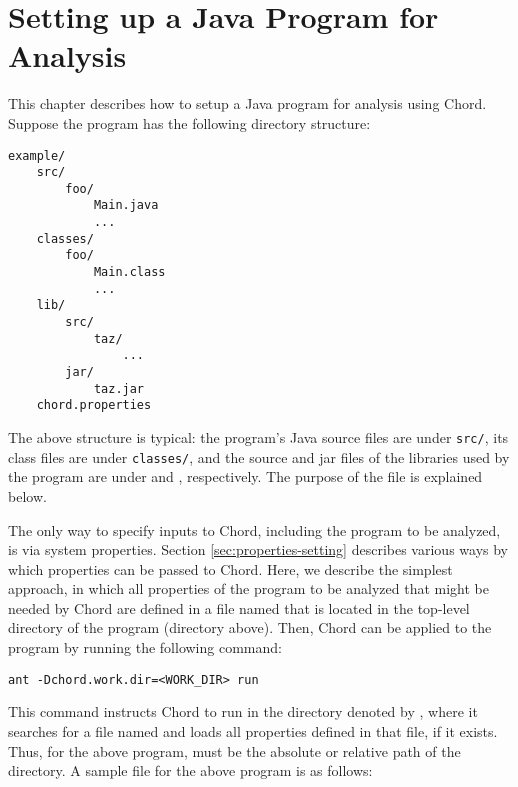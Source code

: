 \chapter{Setting up a Java Program for Analysis}
\label{chap:setup}

This chapter describes how to setup a Java program for analysis using Chord.
Suppose the program has the following directory structure:

\begin{framed}
\begin{verbatim}
example/
    src/
        foo/
            Main.java
            ...
    classes/
        foo/
            Main.class
            ...
    lib/
        src/
            taz/
                ...
        jar/
            taz.jar
    chord.properties
\end{verbatim}
\end{framed}

The above structure is typical: the program's Java source
files are under {\tt src/}, its class files are under {\tt classes/},
and the source and jar files of the libraries used by the program are
under  and , respectively.  The
purpose of the  file is explained below.

The only way to specify inputs to Chord, including the program
to be analyzed, is via system properties.
Section \ref{sec:properties-setting} describes various ways by which
properties can be passed to Chord.  Here, we describe the
simplest approach, in which all properties of the program to be analyzed
that might be needed by Chord are defined in a file named  
that is located in the top-level directory of the program (directory  above).
Then, Chord can be applied to the program by running the following command:

\begin{framed}
\begin{verbatim}
ant -Dchord.work.dir=<WORK_DIR> run
\end{verbatim}
\end{framed}

This command instructs Chord to run in the directory denoted by , where it searches for a file
named  and
loads all properties defined in that file, if it exists.
Thus, for the above program,  must be the absolute or relative path of the
 directory.  A sample  file for the above program is as follows:


